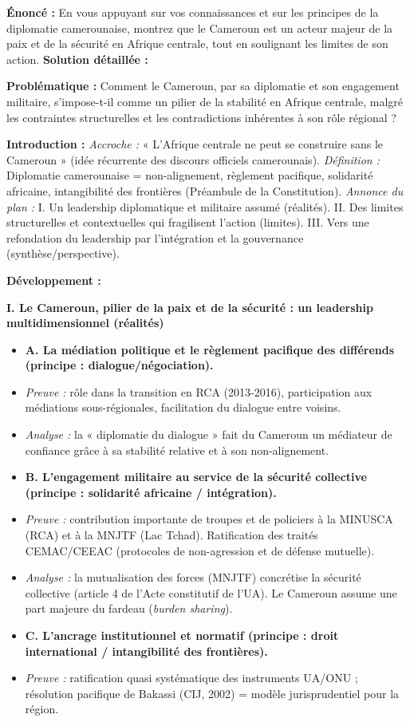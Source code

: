 \documentclass[11pt]{article}
\begin{document}
\begin{exoresolu}
\textbf{Énoncé :} En vous appuyant sur vos connaissances et sur les principes de la diplomatie camerounaise, montrez que le Cameroun est un acteur majeur de la paix et de la sécurité en Afrique centrale, tout en soulignant les limites de son action.
\tcblower
\textbf{Solution détaillée :}

\textbf{Problématique :} Comment le Cameroun, par sa diplomatie et son engagement militaire, s'impose-t-il comme un pilier de la stabilité en Afrique centrale, malgré les contraintes structurelles et les contradictions inhérentes à son rôle régional ?

\textbf{Introduction :}
\emph{Accroche :} « L'Afrique centrale ne peut se construire sans le Cameroun » (idée récurrente des discours officiels camerounais).
\emph{Définition :} Diplomatie camerounaise = non-alignement, règlement pacifique, solidarité africaine, intangibilité des frontières (Préambule de la Constitution).
\emph{Annonce du plan :} I. Un leadership diplomatique et militaire assumé (réalités). II. Des limites structurelles et contextuelles qui fragilisent l'action (limites). III. Vers une refondation du leadership par l'intégration et la gouvernance (synthèse/perspective).

\textbf{Développement :}

\textbf{I. Le Cameroun, pilier de la paix et de la sécurité : un leadership multidimensionnel (réalités)}
\begin{itemize}
    \item \textbf{A. La médiation politique et le règlement pacifique des différends (principe : dialogue/négociation).}
    \item \emph{Preuve :} rôle dans la transition en RCA (2013-2016), participation aux médiations sous-régionales, facilitation du dialogue entre voisins.
    \item \emph{Analyse :} la « diplomatie du dialogue » fait du Cameroun un médiateur de confiance grâce à sa stabilité relative et à son non-alignement.
    \item \textbf{B. L'engagement militaire au service de la sécurité collective (principe : solidarité africaine / intégration).}
    \item \emph{Preuve :} contribution importante de troupes et de policiers à la MINUSCA (RCA) et à la MNJTF (Lac Tchad). Ratification des traités CEMAC/CEEAC (protocoles de non-agression et de défense mutuelle).
    \item \emph{Analyse :} la mutualisation des forces (MNJTF) concrétise la sécurité collective (article 4 de l'Acte constitutif de l'UA). Le Cameroun assume une part majeure du fardeau (\emph{burden sharing}).
    \item \textbf{C. L'ancrage institutionnel et normatif (principe : droit international / intangibilité des frontières).}
    \item \emph{Preuve :} ratification quasi systématique des instruments UA/ONU ; résolution pacifique de Bakassi (CIJ, 2002) = modèle jurisprudentiel pour la région.
\end{itemize}


\end{exoresolu}
\end{document}
